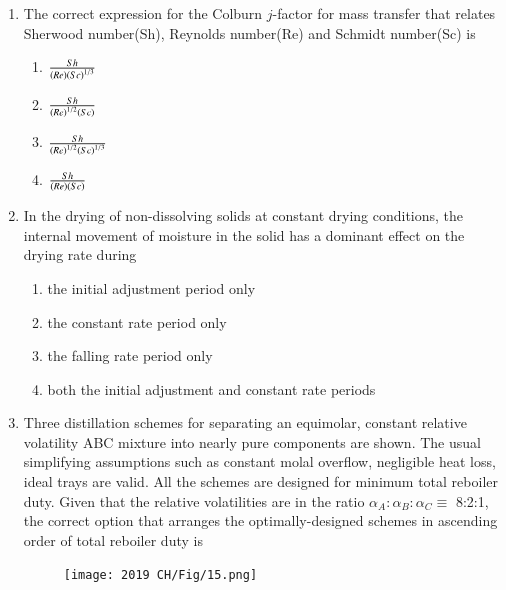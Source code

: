 \documentclass[journal,12pt,onecolumn]{IEEEtran}
\theoremstyle{remark}
\begin{document}
\begin{enumerate}
    \item The correct expression for the Colburn $j$-factor for mass transfer that relates Sherwood number(Sh), Reynolds number(Re) and Schmidt number(Sc) is
    
 \hfill{}
\begin{multicols}{4}
    \begin{enumerate}
        \item $\frac{Sh}{\left(Re\right)\left(Sc\right)^{1/3}}$
        \item $\frac{Sh}{\left(Re\right)^{1/2}\left(Sc\right)}$
        \item $\frac{Sh}{\left(Re\right)^{1/2}\left(Sc\right)^{1/3}}$
        \item $\frac{Sh}{\left(Re\right)\left(Sc\right)}$
    \end{enumerate}
\end{multicols}

    \item In the drying of non-dissolving solids at constant drying conditions, the internal movement of moisture in the solid has a dominant effect on the drying rate during
    
     \hfill{}
\begin{enumerate}
    \item the initial adjustment period only
    \item the constant rate period only
    \item the falling rate period only
    \item both the initial adjustment and constant rate periods
\end{enumerate}

    \item Three distillation schemes for separating an equimolar, constant relative volatility ABC mixture into nearly pure components are shown. The usual simplifying assumptions such as constant molal overflow, negligible heat loss, ideal trays are valid. All the schemes are designed for minimum total reboiler duty. Given that the relative volatilities are in the ratio $\alpha_A:\alpha_B:\alpha_C \equiv$ 8:2:1, the correct option that arranges the optimally-designed schemes in ascending order of total reboiler duty is
    
     \hfill{}
     \begin{figure}[H]
         \centering
         \texttt{[image: 2019 CH/Fig/15.png]}
         \caption{}
         \label{fig:15}
     \end{figure}


\end{enumerate}
\end{document}
